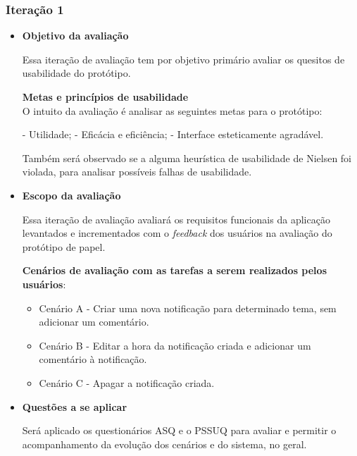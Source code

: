 	\subsubsection{Iteração 1}
	
	  \begin{itemize}
	   \item \textbf{Objetivo da avaliação}
	      
	      \subitem Essa iteração de avaliação tem por objetivo primário avaliar os quesitos de usabilidade do protótipo.
	      
	      \subitem \textbf{Metas e princípios de usabilidade}\\
		O intuito da avaliação é analisar as seguintes metas para o protótipo:
		
		\subsubitem - Utilidade;
		\subsubitem - Eficácia e eficiência;
		\subsubitem - Interface esteticamente agradável.
		
	      Também será observado se a alguma heurística de usabilidade de Nielsen foi violada, para analisar possíveis 
	      falhas de usabilidade.
	    
	   \item \textbf{Escopo da avaliação}
	      
	      \subitem Essa iteração de avaliação avaliará os requisitos funcionais da aplicação levantados e incrementados
	       com o \textit{feedback} dos usuários na avaliação do protótipo de papel.
	      
	      \subitem \textbf{Cenários de avaliação com as tarefas a serem realizados pelos usuários}:
		
		\begin{itemize}
		  \item Cenário A - Criar uma nova notificação para determinado tema, sem adicionar um comentário.

		  \item Cenário B - Editar a hora da notificação criada e adicionar um comentário à notificação.
		    
		  \item Cenário C - Apagar a notificação criada.
		  
		\end{itemize}

	   \item \textbf{Questões a se aplicar}
	      
	      \subitem Será aplicado os questionários ASQ e o PSSUQ para avaliar e permitir o acompanhamento
		da evolução dos cenários e do sistema, no geral.
	      

\end{itemize}
